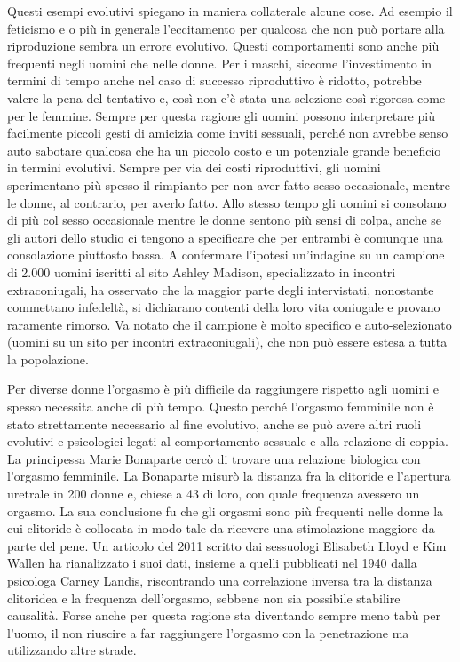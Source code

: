 \documentclass[12pt]{book} %
\begin{document}
Questi esempi evolutivi spiegano in maniera collaterale alcune cose. Ad esempio il feticismo e o più in generale
l'eccitamento per qualcosa che non può portare alla riproduzione sembra un errore evolutivo.
Questi comportamenti sono anche più frequenti negli uomini che nelle donne. Per i maschi, siccome
l'investimento in termini di tempo anche nel caso di successo riproduttivo è ridotto, potrebbe valere la pena
del tentativo e, così non c'è stata una selezione così rigorosa come per le femmine. Sempre per
questa ragione gli uomini possono interpretare più facilmente piccoli gesti di amicizia come inviti sessuali, perché non
avrebbe senso auto sabotare qualcosa che ha un piccolo costo e un potenziale grande beneficio in termini evolutivi.
Sempre per via dei costi riproduttivi, gli uomini sperimentano più spesso il rimpianto per non aver fatto sesso
occasionale, mentre le donne, al contrario, per averlo
fatto.
Allo stesso tempo gli uomini si consolano di più col sesso occasionale mentre le donne sentono più sensi di colpa, anche se gli autori dello studio ci tengono a specificare che per entrambi è comunque una consolazione piuttosto bassa. A confermare l'ipotesi un'indagine su un campione di 2.000 uomini iscritti al sito Ashley Madison, specializzato in incontri extraconiugali, ha osservato che la maggior parte degli intervistati, nonostante commettano infedeltà, si dichiarano contenti della loro vita coniugale e provano raramente rimorso. Va notato che il campione è molto specifico e auto-selezionato (uomini su un sito per incontri extraconiugali), che non può essere estesa a tutta la popolazione.

Per diverse donne l'orgasmo è più difficile da raggiungere
rispetto agli uomini e spesso necessita anche di più tempo. Questo perché l'orgasmo femminile non
è stato strettamente necessario al fine evolutivo, anche se può avere altri ruoli evolutivi e psicologici legati al comportamento sessuale e alla relazione di coppia. La principessa Marie Bonaparte cercò di trovare una relazione biologica con
l'orgasmo femminile. La Bonaparte misurò la distanza fra la clitoride e
l'apertura uretrale in 200 donne e, chiese a 43 di loro, con quale frequenza avessero un orgasmo.
La sua conclusione fu che gli orgasmi sono più frequenti nelle donne la cui clitoride è collocata in modo tale da
ricevere una stimolazione maggiore da parte del pene. Un articolo del 2011 scritto dai sessuologi Elisabeth Lloyd e Kim
Wallen ha rianalizzato i suoi dati, insieme a quelli pubblicati nel 1940 dalla psicologa Carney Landis, riscontrando una correlazione inversa tra la distanza clitoridea e la frequenza dell’orgasmo, sebbene non sia possibile stabilire causalità. Forse anche per questa ragione sta diventando sempre meno tabù per l'uomo, il non riuscire a far raggiungere l'orgasmo con la penetrazione ma utilizzando altre strade.
\end{document}
